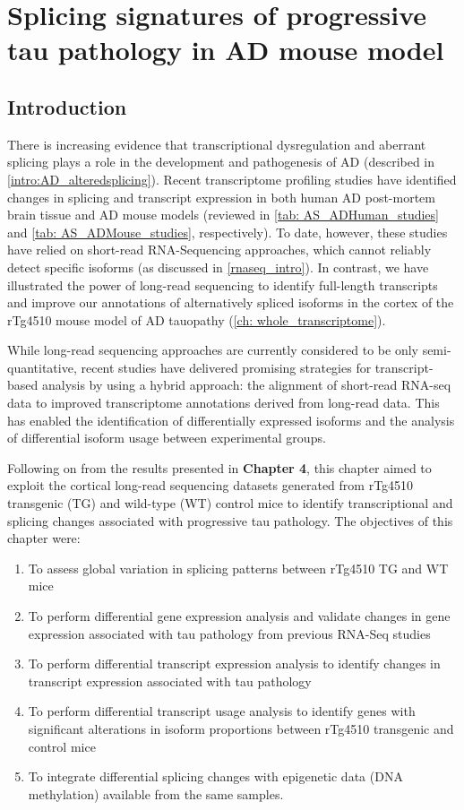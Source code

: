\chapter{Splicing signatures of progressive tau pathology in AD mouse model}\label{ch: transcriptional_global_differences}

\section{Introduction}
There is increasing evidence that transcriptional dysregulation and aberrant splicing plays a role in the development and pathogenesis of AD (described in \cref{intro:AD_alteredsplicing}). Recent transcriptome profiling studies have identified changes in splicing and transcript expression in both human AD post-mortem brain tissue and AD mouse models (reviewed in \cref{tab: AS_ADHuman_studies} and \cref{tab: AS_ADMouse_studies}, respectively). To date, however, these studies have relied on short-read RNA-Sequencing approaches, which cannot reliably detect specific isoforms (as discussed in \cref{rnaseq_intro}).  In contrast, we have illustrated the power of long-read sequencing to identify full-length transcripts and improve our annotations of alternatively spliced isoforms in the cortex of the rTg4510 mouse model of AD tauopathy (\cref{ch: whole_transcriptome}). 

While long-read sequencing approaches are currently considered to be only semi-quantitative, recent studies have delivered promising strategies for transcript-based analysis by using a hybrid approach\cite{Tseng2021}: the alignment of short-read RNA-seq data to improved transcriptome annotations derived from long-read data. This has enabled the identification of differentially expressed isoforms and the analysis of differential isoform usage between experimental groups\cite{Tseng2021}. 

Following on from the results presented in \textbf{Chapter 4}, this chapter aimed to exploit the cortical long-read sequencing datasets generated from rTg4510 transgenic (TG) and wild-type (WT) control mice to identify transcriptional and splicing changes associated with progressive tau pathology. The objectives of this chapter were: 
\begin{enumerate}
	\item To assess global variation in splicing patterns between rTg4510 TG and WT mice
	\item To perform differential gene expression analysis and validate changes in gene expression associated with tau pathology from previous RNA-Seq studies 
	\item To perform differential transcript expression analysis to identify changes in transcript expression associated with tau pathology   
	\item To perform differential transcript usage analysis to identify genes with significant alterations in isoform proportions between rTg4510 transgenic and control mice 
	\item To integrate differential splicing changes with epigenetic data (DNA methylation) available from the same samples.
\end{enumerate} 

